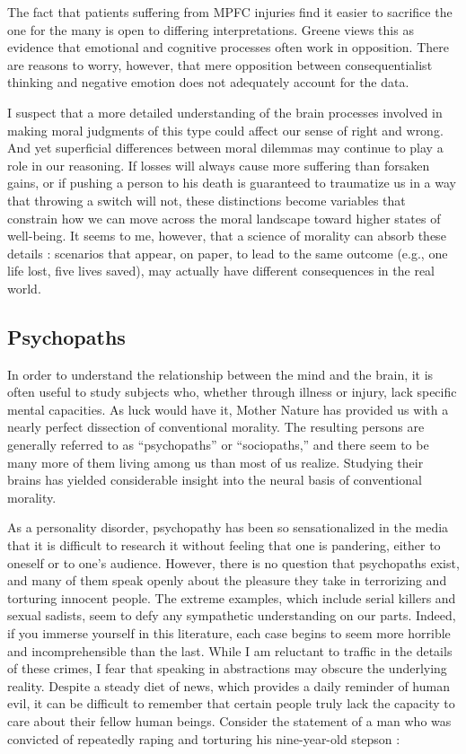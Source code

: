 \documentclass[a4paper,14pt]{extarticle}
\begin{document}
The fact that patients suffering from MPFC injuries find it easier to sacrifice the one for the many is open to differing interpretations.
Greene views this as evidence that emotional and cognitive processes often work in opposition.
There are reasons to worry, however, that mere opposition between consequentialist thinking and negative emotion does not adequately account for the data.

I suspect that a more detailed understanding of the brain processes involved in making moral judgments of this type could affect our sense of right and wrong.
And yet superficial differences between moral dilemmas may continue to play a role in our reasoning.
If losses will always cause more suffering than forsaken gains, or if pushing a person to his death is guaranteed to traumatize us in a way that throwing a switch will not, these distinctions become variables that constrain how we can move across the moral landscape toward higher states of well-being.
It seems to me, however, that a science of morality can absorb these details :
scenarios that appear, on paper, to lead to the same outcome (e.g., one life lost, five lives saved), may actually have different consequences in the real world.

\subsection{Psychopaths}

In order to understand the relationship between the mind and the brain, it is often useful to study subjects who, whether through illness or injury, lack specific mental capacities.
As luck would have it, Mother Nature has provided us with a nearly perfect dissection of conventional morality.
The resulting persons are generally referred to as ``psychopaths'' or ``sociopaths,'' and there seem to be many more of them living among us than most of us realize.
Studying their brains has yielded considerable insight into the neural basis of conventional morality.

As a personality disorder, psychopathy has been so sensationalized in the media that it is difficult to research it without feeling that one is pandering, either to oneself or to one’s audience.
However, there is no question that psychopaths exist, and many of them speak openly about the pleasure they take in terrorizing and torturing innocent people.
The extreme examples, which include serial killers and sexual sadists, seem to defy any sympathetic understanding on our parts.
Indeed, if you immerse yourself in this literature, each case begins to seem more horrible and incomprehensible than the last.
While I am reluctant to traffic in the details of these crimes, I fear that speaking in abstractions may obscure the underlying reality.
Despite a steady diet of news, which provides a daily reminder of human evil, it can be difficult to remember that certain people truly lack the capacity to care about their fellow human beings.
Consider the statement of a man who was convicted of repeatedly raping and torturing his nine-year-old stepson :
\end{document}
